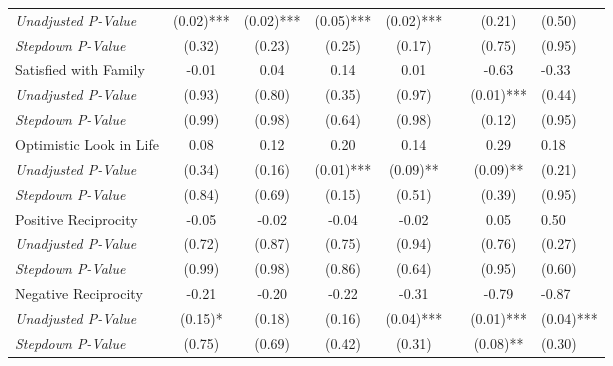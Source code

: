 \begin{tabular}{l c c c c c c}
\quad \textit{Unadjusted P-Value} & (0.02)*** & (0.02)*** & (0.05)*** & (0.02)*** & & (0.21) & (0.50) \\
\quad \textit{Stepdown P-Value} & (0.32) & (0.23) & (0.25) & (0.17) & & (0.75) & (0.95) \\
Satisfied with Family & -0.01 & 0.04 & 0.14 & 0.01 & & -0.63 & -0.33 \\
\quad \textit{Unadjusted P-Value} & (0.93) & (0.80) & (0.35) & (0.97) & & (0.01)*** & (0.44) \\
\quad \textit{Stepdown P-Value} & (0.99) & (0.98) & (0.64) & (0.98) & & (0.12) & (0.95) \\
Optimistic Look in Life & 0.08 & 0.12 & 0.20 & 0.14 & & 0.29 & 0.18 \\
\quad \textit{Unadjusted P-Value} & (0.34) & (0.16) & (0.01)*** & (0.09)** & & (0.09)** & (0.21) \\
\quad \textit{Stepdown P-Value} & (0.84) & (0.69) & (0.15) & (0.51) & & (0.39) & (0.95) \\
Positive Reciprocity & -0.05 & -0.02 & -0.04 & -0.02 & & 0.05 & 0.50 \\
\quad \textit{Unadjusted P-Value} & (0.72) & (0.87) & (0.75) & (0.94) & & (0.76) & (0.27) \\
\quad \textit{Stepdown P-Value} & (0.99) & (0.98) & (0.86) & (0.64) & & (0.95) & (0.60) \\
Negative Reciprocity & -0.21 & -0.20 & -0.22 & -0.31 & & -0.79 & -0.87 \\
\quad \textit{Unadjusted P-Value} & (0.15)* & (0.18) & (0.16) & (0.04)*** & & (0.01)*** & (0.04)*** \\
\quad \textit{Stepdown P-Value} & (0.75) & (0.69) & (0.42) & (0.31) & & (0.08)** & (0.30) \\
\bottomrule
\end{tabular}
